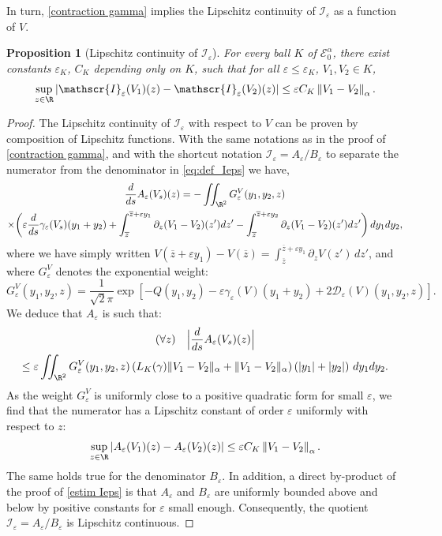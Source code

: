 \documentclass[JEP,XML,SOM,Unicode]{cedram}
\let\mathcal\mathscr
\newcommand{\cI}{\mathcal{I}}
\theoremstyle{plain}
\newtheorem{prop}[thm]{Proposition}
\theoremstyle{definition}
\newcommand{\D}{\mathcal{D}_\eps}
\let\eps\varepsilon
\let\ds\displaystyle
\newcommand{\abs}[1]{\left\lvert#1\right\rvert}
\newcommand{\nalph}[1]{\left\lVert#1\right\rVert_\alpha}
\newcommand{\Eaz}{\mathcal{E}^\alpha_0}
\newcommand{\QV}{G_\eps^V}
\newcommand{\bz}{\overline{z}}
\newcommand{\Cgamma}{L_K(\gamma)}
\newcommand{\dint}{\displaystyle \int}
\begin{document}
In turn, \cref{contraction gamma} implies the Lipschitz continuity of $\cI_\eps$ as a function of $V$.

\begin{prop}[Lipschitz continuity of $\cI_\eps$]\label{cont Ieps}
For every ball $K$ of $\Eaz$, there exist constants $\eps_K$, $C_K$ depending only on $K$, such that for all $\eps \leq \eps_K $, $V_1, V_2 \in K$,
\begin{equation}\label{eq:cont_Ieps}
\sup_{z\in \R}\abs{\cI_\eps(V_1)(z)-\cI_\eps(V_2)(z)} \leq \eps C_K \nalph{ V_1 - V_2}.
\end{equation}
\end{prop}
\begin{proof}
The Lipschitz continuity of $\cI_\eps$ with respect to $V$ can be proven by composition of Lipschitz functions. With the same notations as in the proof of \cref{contraction gamma}, and with the shortcut notation $\cI_\eps = A_\eps/B_\eps$ to separate the numerator from the deno\-mi\-nator in \eqref{eq:def_Ieps} we have,
\begin{multline*}
\dfrac{d}{ds} A_\eps(V_s)(z) = - \iint_{\R^2} \QV(y_1,y_2, z)\\
\times \biggl (\eps \dfrac{d}{ds} \gamma_\eps (V_s) (y_1 + y_2)
+ \dint_{\bz}^{\bz+\eps y_1} \partial_z (V_1-V_2)(z') dz' -\dint_{\bz}^{\bz+\eps y_2} \partial_z (V_1-V_2)(z') dz' \biggr) \, dy_1 dy_2,
\end{multline*}
where we have simply written $V(\bz+\eps y_1) - V(\bz) = \int_{\bz}^{\bz+\eps y_1} \partial_z V(z')\, dz'$, and where $\QV$ denotes the exponential weight:
\begin{equation*}
\QV(y_1,y_2, z) = \dfrac1{\sqrt{2}\pi} \ds \exp\left[-Q(y_1,y_2) -\eps\gamma_\eps(V)(y_1+y_2) + 2 \D(V)(y_1,y_2,z) \right].
\end{equation*}
We deduce that $A_\eps$ is such that:
\begin{multline*}
(\forall z)\quad \Bigl | \dfrac{d}{ds} A_\eps(V_s)(z) \Bigr |\\
\leq \eps \iint_{\R^2} \QV(y_1,y_2, z) \left (\Cgamma \| V_1 - V_2\|_\alpha + \| V_1 - V_2\|_\alpha \right) \left (|y_1| + |y_2|\right) \, dy_1 dy_2.
\end{multline*}
As the weight $\QV$ is uniformly close to a positive quadratic form for small $\eps$, we find that the numerator has a Lipschitz constant of order $\eps$ uniformly with respect to $z$:
\begin{equation*}
\sup_{z\in \R}\abs{A_\eps(V_1)(z)-A_\eps(V_2)(z)} \leq \eps C_K \nalph{ V_1 - V_2}.
\end{equation*}
The same holds true for the denominator $B_\eps$. In addition, a direct by-product of the proof of \cref{estim Ieps} is that $A_\eps$ and $B_\eps$ are uniformly bounded above and below by positive constants for $\eps$ small enough. Consequently, the quotient $\cI_\eps = A_\eps/B_\eps$ is Lipschitz continuous.
\end{proof}
\end{document}
